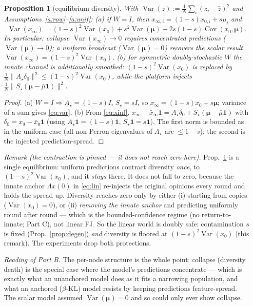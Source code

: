 \documentclass[11pt]{article}
\newtheorem{proposition}{Proposition}
\theoremstyle{definition}
\newcommand{\one}{\mathbf{1}}
\DeclareMathOperator{\Var}{Var}
\DeclareMathOperator{\Cov}{Cov}
\begin{document}
\begin{proposition}[equilibrium diversity]\label{prop:var}
With $\Var(z):=\tfrac1N\sum_i(z_i-\bar z)^2$ and Assumptions~\ref{a:row}--\ref{a:unif}:
\textup{(a)} if $W=I$, then $x_{\infty,i}=(1-s)x_{0,i}+s\mu_i$ and
\begin{equation}\label{eq:var}
\Var(x_\infty)=(1-s)^2\Var(x_0)+s^2\Var(\bm{\mu})+2s(1-s)\Cov(x_0,\bm{\mu}).
\end{equation}
In particular: collapse $\Var(x_\infty)\to0$ requires \emph{concentrated} predictions
($\Var(\bm{\mu})\to0$); a uniform broadcast ($\Var(\bm{\mu})=0$) recovers the scalar
result $\Var(x_\infty)=(1-s)^2\Var(x_0)$.
\textup{(b)} for symmetric doubly-stochastic $W$ the innate channel is additionally
smoothed: $(1-s)^2\Var(x_0)$ is replaced by $\tfrac1N\|A_\star\delta_0\|^2\le(1-s)^2\Var(x_0)$,
while the platform injects $\tfrac1N\|S_\star(\bm{\mu}-\bar\mu\one)\|^2$.
\end{proposition}
\begin{proof}
\textup{(a)} $W=I\Rightarrow A_\star=(1-s)I$, $S_\star=sI$, so $x_\infty=(1-s)x_0+s\bm{\mu}$;
variance of a sum gives \eqref{eq:var}.
\textup{(b)} From \eqref{eq:xinf}, $x_\infty-\bar x_\infty\one=A_\star\delta_0
+S_\star(\bm{\mu}-\bar\mu\one)$ with $\delta_0=x_0-\bar x_0\one$ (using
$A_\star\one=(1-s)\one$, $S_\star\one=s\one$). The first norm is bounded as in the
uniform case (all non-Perron eigenvalues of $A_\star$ are $\le1-s$); the second is the
injected prediction-spread.
\end{proof}

\noindent\emph{Remark (the contraction is pinned --- it does not reach zero here).}
Prop.~\ref{prop:var} is a single equilibrium: uniform predictions contract diversity
\emph{once}, to $(1-s)^2\Var(x_0)$, and it \emph{stays} there. It does not fall to zero,
because the innate anchor $\Lambda x(0)$ in \eqref{eq:lin} re-injects the original
opinions every round and holds the spread up. Diversity reaches zero only by either
\textup{(i)} starting from copies ($\Var(x_0)=0$), or \textup{(ii)} \emph{removing the
innate anchor} and predicting uniformly round after round --- which is the
bounded-confidence regime (no return-to-innate; Part C), not linear FJ. So the linear
world is doubly safe: contamination $s$ is fixed (Prop.~\ref{prop:degen}) \emph{and}
diversity is floored at $(1-s)^2\Var(x_0)$ (this remark). The experiments drop both
protections.

\noindent\emph{Reading of Part B.} The per-node structure is the whole point: collapse
(diversity death) is the special case where the model's predictions concentrate ---
which is exactly what an unanchored model does as it fits a narrowing population, and
what an anchored ($\beta$-KL) model resists by keeping predictions feature-spread. The
scalar model assumed $\Var(\bm{\mu})=0$ and so could only ever show collapse.
\end{document}
